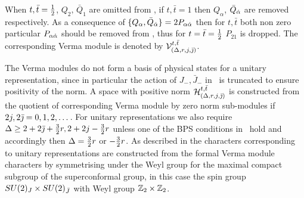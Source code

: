 When $t,{\bar t} = {\textstyle {1 \over 2}}$, $Q_2, \,{\bar Q}_1$ are omitted from \vermam, if 
$t,{\bar t}=1$ then $Q_\alpha$, ${\bar Q}_{\dot \alpha}$ are removed respectively. 
As a consequence of $\{Q_{\alpha},{\bar Q}_{\dot \alpha}\}=2P_{{\alpha}{\dot \alpha}}$ then for $t,{\bar t}$ 
both non zero particular $P_{{\alpha}{\dot \alpha}}$ should be removed from \vermam, thus for 
$t={\bar t}={\textstyle {1 \over 2}}$ $P_{21}$ is dropped. The corresponding Verma module is
denoted by ${\cal V}^{t,{\bar t}}_{(\Delta,r,j,{\bar \jmath})}$. 

The Verma modules do not form a basis of physical states for a unitary representation,
since in particular the action of $J_-,{\bar J}_-$ in \vermam\ is truncated to ensure
positivity of the norm. A space with positive norm ${\cal H}^{t,{\bar t}}_{(\Delta,r,j,{\bar \jmath})}$ 
is constructed from the quotient of corresponding Verma module by zero norm 
sub-modules if $2j,2{\bar \jmath}= 0,1,2, \dots$.  
For unitary representations we also require $\Delta \ge 2+2{\bar \jmath}+{\textstyle{3\over 2}}r,
2+2j-{\textstyle{3\over 2}}r$ unless one of the BPS conditions in \quars\ hold and 
accordingly then $\Delta = {\textstyle{3\over 2}}r $ or $- {\textstyle{3\over 2}}r$. As described 
in  the characters corresponding to unitary representations are 
constructed from the formal Verma module characters by symmetrising under the Weyl 
group for the maximal compact subgroup of the superconformal group, in this case 
the spin group $SU(2)_J\times SU(2)_{\bar J}$ with Weyl group $\Bbb Z_2 \times \Bbb Z_2$.


